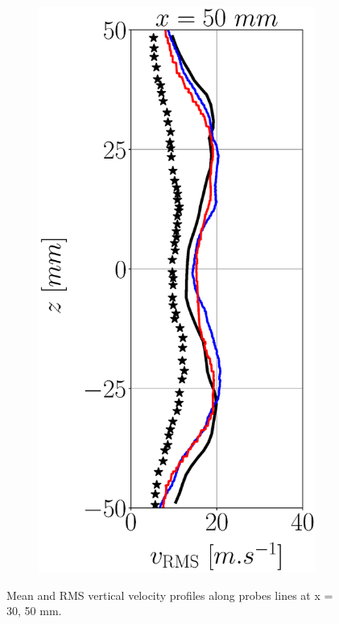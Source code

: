 \begin{figure}[h!]
\begin{subfigure}[b]{0.22\textwidth}
\end{subfigure}
   \hspace{0.05in}
\begin{subfigure}[b]{0.22\textwidth}
	\centering
   \includegraphics[scale=0.25]{./part3_applications/figures_ch7_aero/BIMER_validation_quantitative_lines/x50_w_vertical_rms.eps}
\end{subfigure}
\caption{Mean and RMS vertical velocity profiles along probes lines at x = 30, 50 mm.}
\label{fig:BIMER_quantitative_validation_verticals_velocities}
\end{figure}


